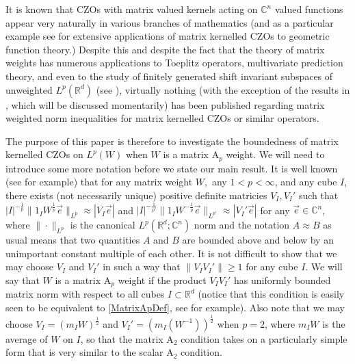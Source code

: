 \documentclass[12pt,reqno ]{amsart}
\numberwithin{equation}{section}
\theoremstyle{definition}
\newcommand{\C}{\ensuremath{\mathbb{C}^n}}
\newcommand{\R}{\ensuremath{\mathbb{R}}}
\newcommand{\Rd}{\ensuremath{\mathbb{R}^d}}
\begin{document}
It is known that CZOs with matrix valued kernels acting on $\C$ valued functions appear very naturally in various branches of mathematics (and as a particular example see \cite{IM1} for extensive applications of matrix kernelled CZOs to geometric function theory.) Despite this and despite the fact that the theory of matrix weights has numerous applications to Toeplitz operators, multivariate prediction theory, and even to the study of finitely generated shift invariant subspaces of unweighted $L^p(\Rd)$ (see \cite{NT, Mo, V}), virtually nothing (with the exception of the results in \cite{IKP}, which will be discussed momentarily) has been published regarding matrix weighted norm inequalities for matrix kernelled CZOs or similar operators.

The purpose of this paper is therefore to investigate the boundedness of matrix kernelled CZOs on $L^p(W)$ when $W$ is a matrix A${}_p$ weight.  We will need to introduce some more notation before we state our main result.  It is well known (see \cite{G} for example) that for any matrix weight $W,$ any $1 < p < \infty$, and any cube $I$, there exists (not necessarily unique) positive definite matricies  $V_I, V_I '$ such that  $|I|^{- \frac{1}{p}} \|1_I W^\frac{1}{p}  \vec{e}\|_{L^p} \approx |V_I \vec{e}|$ and $|I|^{- \frac{1}{p'}} \|1_I W^{-\frac{1}{p}} \vec{e}\|_{L^{p'}} \approx |V_I ' \vec{e}|$ for any $\vec{e} \in \C$, where $\|\cdot \|_{L^p}$ is the canonical $L^p(\R^d;\C)$ norm and the notation $A \approx B$ as usual means that two quantities $A$ and $B$ are bounded above and below by an unimportant constant multiple of each other.  It is not difficult to show that we may choose $V_I$ and $V_I'$ in such a way that $\|V_I V_I ' \| \geq 1$ for any cube $I$.  We will say that $W$ is a matrix A${}_p$ weight if the product $V_I V_I'$ has uniformly bounded matrix norm with respect to all cubes $I \subset \R^d$ (notice that this condition is easily seen to be equivalent to \eqref{MatrixApDef},  see \cite{R} for example). Also note that we may choose $V_I = (m_I W)^\frac{1}{2}$ and $V_I ' = (m_I (W^{-1}))^{\frac{1}{2}}$ when $p = 2$, where $m_I  W$ is the average of $W$ on $I$, so that the matrix A${}_2$ condition takes on a particularly simple form that is very similar to the scalar A${}_2$ condition.
\end{document}
